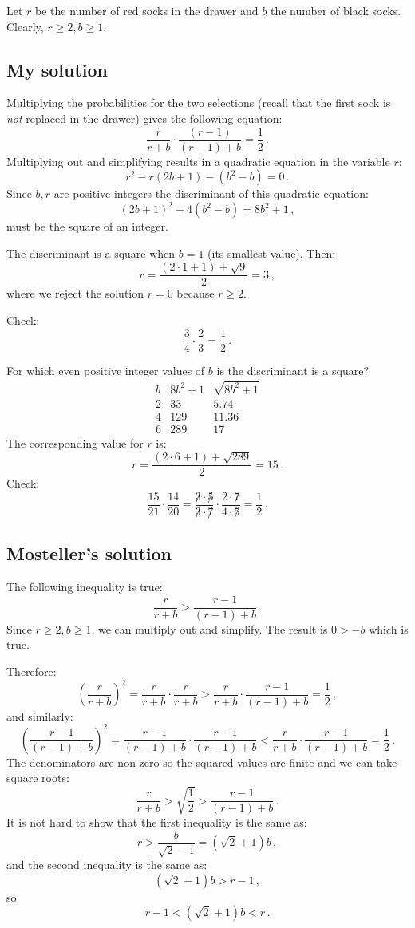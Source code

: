 \documentclass[11pt,a4paper]{article}
\newcommand*{\disfrac}[2]{\displaystyle\frac{#1}{#2}}
\begin{document}
Let $r$ be the number of red socks in the drawer and $b$ the number of black socks.  Clearly, $r\geq 2, b\geq 1$.

\subsection*{My solution}

Multiplying the probabilities for the two selections (recall that the first sock is \emph{not} replaced in the drawer) gives the following equation:
\[
\frac{r}{r+b} \cdot \frac{(r-1)}{(r-1)+b} = \frac{1}{2}\,.
\]
Multiplying out and simplifying results in a quadratic equation in the variable $r$:
\[
r^2-r(2b+1)-(b^2-b)=0\,.
\]
Since $b,r$ are positive integers the discriminant of this quadratic equation:
\[
(2b+1)^2+4(b^2-b)=8b^2+1\,,
\]
must be the square of an integer.

The discriminant is a square when $b=1$ (its smallest value). Then:
\[
r= \disfrac{(2\cdot 1 + 1)+ \sqrt{9}}{2}=3\,,
\]
where we reject the solution $r=0$ because $r\geq 2$.

Check:
\[
\disfrac{3}{4}\cdot\disfrac{2}{3}=\disfrac{1}{2}\,.
\]

\bigskip

For which even positive integer values of $b$ is the discriminant is a square?
\begin{displaymath}
\renewcommand{\arraystretch}{1}
\begin{array}{r|r|r}
b&8b^2+1&\sqrt{8b^2+1}\\
\hline
2&33&5.74\\
4&129&11.36\\
6&289&17
\end{array}
\end{displaymath}
The corresponding value for $r$ is:
\[
r=\disfrac{(2\cdot 6+1)+\sqrt{289}}{2}=15\,.
\]
Check:
\[
\disfrac{15}{21}\cdot\disfrac{14}{20}=\disfrac{\not 3\cdot \not 5}{\not 3\cdot \not 7}\cdot\disfrac{2\cdot \not 7}{4\cdot \not 5}=\disfrac{1}{2}\,.
\]

\subsection*{Mosteller's solution}

The following inequality is true:
\[
\frac{r}{r+b} > \frac{r-1}{(r-1)+b}\,.
\]
Since $r\geq 2, b\geq 1$, we can multiply out and simplify. The result is $0>-b$ which is true.

Therefore:
\[
\left(\frac{r}{r+b}\right)^2 = \frac{r}{r+b} \cdot\frac{r}{r+b} > \frac{r}{r+b} \cdot \frac{r-1}{(r-1)+b} = \frac{1}{2}\,,
\]
and similarly:
\[
\left(\frac{r-1}{(r-1)+b}\right)^2  = \frac{r-1}{(r-1)+b}\cdot \frac{r-1}{(r-1)+b}<  \frac{r}{r+b} \cdot \frac{r-1}{(r-1)+b} = \frac{1}{2}\,.
\]
The denominators are non-zero so the squared values are finite and we can take square roots:
\[
\frac{r}{r+b}  > \sqrt{\frac{1}{2}} > \frac{r-1}{(r-1)+b}  \,.
\]
It is not hard to show that the first inequality is the same as:
\[
r>\frac{b}{\sqrt{2}-1}=(\sqrt{2}+1)b\,,
\]
and the second inequality is the same as:
\[
(\sqrt{2}+1)b>r-1\,,
\]
so
\[
r-1<(\sqrt{2}+1)b<r\,.
\]
\end{document}
